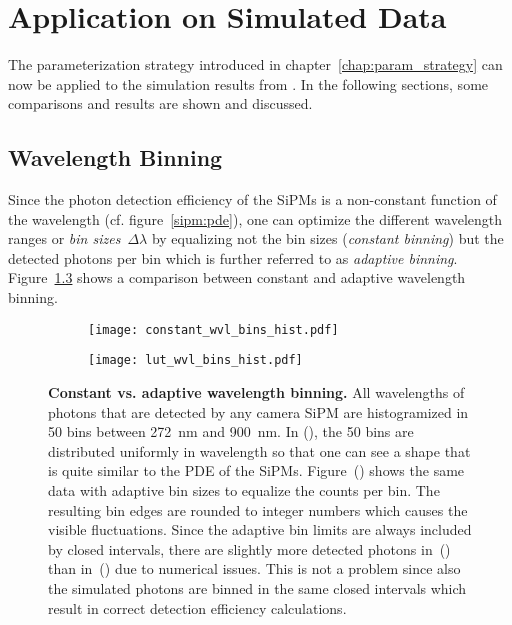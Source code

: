\chapter{Application on Simulated Data}

The parameterization strategy introduced in chapter~\ref{chap:param_strategy} can now be applied to the simulation results from \geant. In the following sections, some comparisons and results are shown and discussed.

\section{Wavelength Binning}\label{sec:wvl_binning}

Since the photon detection efficiency of the SiPMs is a non-constant function of the wavelength (cf. figure~\ref{sipm:pde}), one can optimize the different wavelength ranges or \textit{bin sizes}~$\Delta\lambda$ by equalizing not the bin sizes (\textit{constant binning}) but the detected photons per bin which is further referred to as \textit{adaptive binning}. Figure~\ref{param:wvl_binning} shows a comparison between constant and adaptive wavelength binning.

\begin{figure}[H]
	\centering
	\begin{subfigure}[t]{0.49\textwidth}
		\texttt{[image: constant\_wvl\_bins\_hist.pdf]}
		\label{param:wvl_binning:constant}
	\end{subfigure}
	\hfill
	\begin{subfigure}[t]{0.49\textwidth}
		\texttt{[image: lut\_wvl\_bins\_hist.pdf]}
		\label{param:wvl_binning:adaptive}
	\end{subfigure}
	\caption[Constant vs. adaptive wavelength binning]{\textbf{Constant vs. adaptive wavelength binning.} All wavelengths of photons that are detected by any camera SiPM are histogramized in \num{50} bins between \SI{272}{\nano\meter} and \SI{900}{\nano\meter}. In (), the \num{50} bins are distributed uniformly in wavelength so that one can see a shape that is quite similar to the PDE of the SiPMs. Figure~() shows the same data with adaptive bin sizes to equalize the counts per bin. The resulting bin edges are rounded to integer numbers which causes the visible fluctuations. Since the adaptive bin limits are always included by closed intervals, there are slightly more detected photons in~() than in~() due to numerical issues. This is not a problem since also the simulated photons are binned in the same closed intervals which result in correct detection efficiency calculations.}
	\label{param:wvl_binning}
\end{figure}

